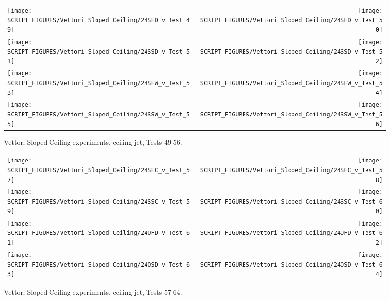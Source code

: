 \begin{figure}[p]
\begin{tabular*}{\textwidth}{l@{\extracolsep{\fill}}r}
\texttt{[image: SCRIPT\_FIGURES/Vettori\_Sloped\_Ceiling/24SFD\_v\_Test\_49]} &
\texttt{[image: SCRIPT\_FIGURES/Vettori\_Sloped\_Ceiling/24SFD\_v\_Test\_50]} \\
\texttt{[image: SCRIPT\_FIGURES/Vettori\_Sloped\_Ceiling/24SSD\_v\_Test\_51]} &
\texttt{[image: SCRIPT\_FIGURES/Vettori\_Sloped\_Ceiling/24SSD\_v\_Test\_52]} \\
\texttt{[image: SCRIPT\_FIGURES/Vettori\_Sloped\_Ceiling/24SFW\_v\_Test\_53]} &
\texttt{[image: SCRIPT\_FIGURES/Vettori\_Sloped\_Ceiling/24SFW\_v\_Test\_54]} \\
\texttt{[image: SCRIPT\_FIGURES/Vettori\_Sloped\_Ceiling/24SSW\_v\_Test\_55]} &
\texttt{[image: SCRIPT\_FIGURES/Vettori\_Sloped\_Ceiling/24SSW\_v\_Test\_56]} \\
\end{tabular*}
\caption{Vettori Sloped Ceiling experiments, ceiling jet, Tests 49-56.}
\label{Vettori_Sloped_7}
\end{figure}

\begin{figure}[p]
\begin{tabular*}{\textwidth}{l@{\extracolsep{\fill}}r}
\texttt{[image: SCRIPT\_FIGURES/Vettori\_Sloped\_Ceiling/24SFC\_v\_Test\_57]} &
\texttt{[image: SCRIPT\_FIGURES/Vettori\_Sloped\_Ceiling/24SFC\_v\_Test\_58]} \\
\texttt{[image: SCRIPT\_FIGURES/Vettori\_Sloped\_Ceiling/24SSC\_v\_Test\_59]} &
\texttt{[image: SCRIPT\_FIGURES/Vettori\_Sloped\_Ceiling/24SSC\_v\_Test\_60]} \\
\texttt{[image: SCRIPT\_FIGURES/Vettori\_Sloped\_Ceiling/24OFD\_v\_Test\_61]} &
\texttt{[image: SCRIPT\_FIGURES/Vettori\_Sloped\_Ceiling/24OFD\_v\_Test\_62]} \\
\texttt{[image: SCRIPT\_FIGURES/Vettori\_Sloped\_Ceiling/24OSD\_v\_Test\_63]} &
\texttt{[image: SCRIPT\_FIGURES/Vettori\_Sloped\_Ceiling/24OSD\_v\_Test\_64]} \\
\end{tabular*}
\caption{Vettori Sloped Ceiling experiments, ceiling jet, Tests 57-64.}
\label{Vettori_Sloped_8}
\end{figure}

